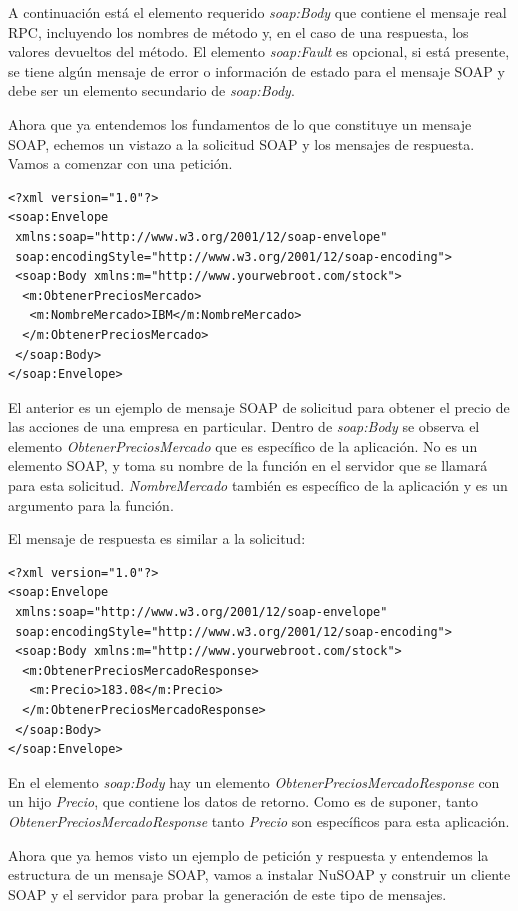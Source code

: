 A continuación está el elemento requerido \textit{soap:Body} que contiene el mensaje real RPC, incluyendo 
los nombres de método y, en el caso de una respuesta, los valores devueltos del método. El elemento 
\textit{soap:Fault} es opcional, si está presente, se tiene algún mensaje de error o información de estado 
para el mensaje SOAP y debe ser un elemento secundario de \textit{soap:Body}.

Ahora que ya entendemos los fundamentos de lo que constituye un mensaje SOAP, echemos un vistazo a la 
solicitud SOAP y los mensajes de respuesta. Vamos a comenzar con una petición.

\begin{verbatim}
<?xml version="1.0"?>
<soap:Envelope
 xmlns:soap="http://www.w3.org/2001/12/soap-envelope"
 soap:encodingStyle="http://www.w3.org/2001/12/soap-encoding">
 <soap:Body xmlns:m="http://www.yourwebroot.com/stock">
  <m:ObtenerPreciosMercado>
   <m:NombreMercado>IBM</m:NombreMercado>
  </m:ObtenerPreciosMercado>
 </soap:Body>
</soap:Envelope>
\end{verbatim}

El anterior es un ejemplo de mensaje SOAP de solicitud para obtener el precio de las acciones de una 
empresa en particular. Dentro de \textit{soap:Body} se observa el elemento \textit{ObtenerPreciosMercado} que es 
específico de la aplicación. No es un elemento SOAP, y toma su nombre de la función en el servidor que se 
llamará para esta solicitud. \textit{NombreMercado} también es específico de la aplicación y es un argumento 
para la función.

El mensaje de respuesta es similar a la solicitud:

\begin{verbatim}
<?xml version="1.0"?>
<soap:Envelope
 xmlns:soap="http://www.w3.org/2001/12/soap-envelope"
 soap:encodingStyle="http://www.w3.org/2001/12/soap-encoding">
 <soap:Body xmlns:m="http://www.yourwebroot.com/stock">
  <m:ObtenerPreciosMercadoResponse>
   <m:Precio>183.08</m:Precio>
  </m:ObtenerPreciosMercadoResponse>
 </soap:Body>
</soap:Envelope>
\end{verbatim}

En el elemento \textit{soap:Body} hay un elemento \textit{ObtenerPreciosMercadoResponse} con un hijo \textit{Precio}, 
que contiene los datos de retorno. Como es de suponer, tanto \textit{ObtenerPreciosMercadoResponse} tanto \textit{Precio} 
son específicos para esta aplicación.
 
Ahora que ya hemos visto un ejemplo de petición y respuesta y entendemos la estructura de un mensaje SOAP, 
vamos a instalar NuSOAP y construir un cliente SOAP y el servidor para probar la generación de este tipo de 
mensajes.

